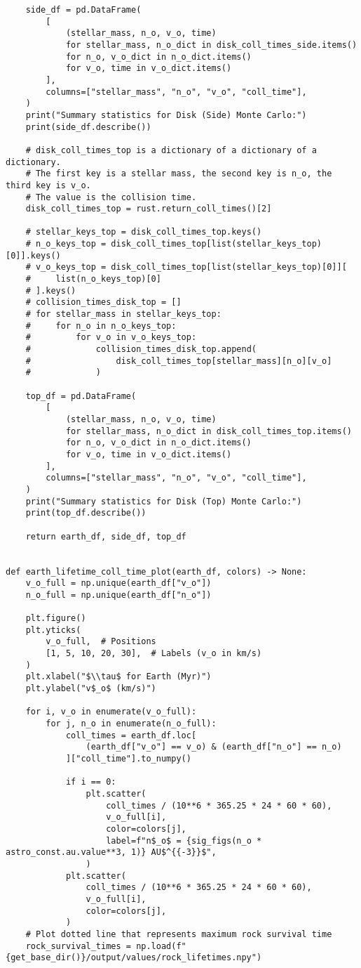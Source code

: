 \begin{lstlisting}
    side_df = pd.DataFrame(
        [
            (stellar_mass, n_o, v_o, time)
            for stellar_mass, n_o_dict in disk_coll_times_side.items()
            for n_o, v_o_dict in n_o_dict.items()
            for v_o, time in v_o_dict.items()
        ],
        columns=["stellar_mass", "n_o", "v_o", "coll_time"],
    )
    print("Summary statistics for Disk (Side) Monte Carlo:")
    print(side_df.describe())

    # disk_coll_times_top is a dictionary of a dictionary of a dictionary.
    # The first key is a stellar mass, the second key is n_o, the third key is v_o.
    # The value is the collision time.
    disk_coll_times_top = rust.return_coll_times()[2]

    # stellar_keys_top = disk_coll_times_top.keys()
    # n_o_keys_top = disk_coll_times_top[list(stellar_keys_top)[0]].keys()
    # v_o_keys_top = disk_coll_times_top[list(stellar_keys_top)[0]][
    #     list(n_o_keys_top)[0]
    # ].keys()
    # collision_times_disk_top = []
    # for stellar_mass in stellar_keys_top:
    #     for n_o in n_o_keys_top:
    #         for v_o in v_o_keys_top:
    #             collision_times_disk_top.append(
    #                 disk_coll_times_top[stellar_mass][n_o][v_o]
    #             )

    top_df = pd.DataFrame(
        [
            (stellar_mass, n_o, v_o, time)
            for stellar_mass, n_o_dict in disk_coll_times_top.items()
            for n_o, v_o_dict in n_o_dict.items()
            for v_o, time in v_o_dict.items()
        ],
        columns=["stellar_mass", "n_o", "v_o", "coll_time"],
    )
    print("Summary statistics for Disk (Top) Monte Carlo:")
    print(top_df.describe())

    return earth_df, side_df, top_df


def earth_lifetime_coll_time_plot(earth_df, colors) -> None:
    v_o_full = np.unique(earth_df["v_o"])
    n_o_full = np.unique(earth_df["n_o"])

    plt.figure()
    plt.yticks(
        v_o_full,  # Positions
        [1, 5, 10, 20, 30],  # Labels (v_o in km/s)
    )
    plt.xlabel("$\\tau$ for Earth (Myr)")
    plt.ylabel("v$_o$ (km/s)")

    for i, v_o in enumerate(v_o_full):
        for j, n_o in enumerate(n_o_full):
            coll_times = earth_df.loc[
                (earth_df["v_o"] == v_o) & (earth_df["n_o"] == n_o)
            ]["coll_time"].to_numpy()

            if i == 0:
                plt.scatter(
                    coll_times / (10**6 * 365.25 * 24 * 60 * 60),
                    v_o_full[i],
                    color=colors[j],
                    label=f"n$_o$ = {sig_figs(n_o * astro_const.au.value**3, 1)} AU$^{{-3}}$",
                )
            plt.scatter(
                coll_times / (10**6 * 365.25 * 24 * 60 * 60),
                v_o_full[i],
                color=colors[j],
            )
    # Plot dotted line that represents maximum rock survival time
    rock_survival_times = np.load(f"{get_base_dir()}/output/values/rock_lifetimes.npy")


\end{lstlisting}

